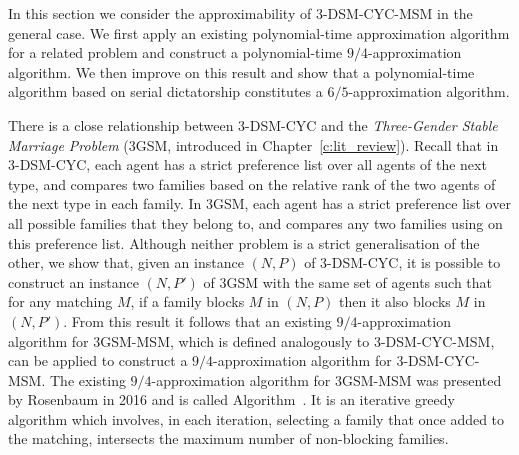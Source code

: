 In this section we consider the approximability of 3-DSM-CYC-MSM in the general case. We first apply an existing polynomial-time approximation algorithm for a related problem and construct a polynomial-time $9/4$-approximation algorithm. We then improve on this result and show that a polynomial-time algorithm based on serial dictatorship constitutes a $6/5$-approximation algorithm.

There is a close relationship between 3-DSM-CYC and the \emph{Three-Gender Stable Marriage Problem} (3GSM, introduced in Chapter~\ref{c:lit_review}). Recall that in 3-DSM-CYC, each agent has a strict preference list over all agents of the next type, and compares two families based on the relative rank of the two agents of the next type in each family. In 3GSM, each agent has a strict preference list over all possible families that they belong to, and compares any two families using on this preference list. Although neither problem is a strict generalisation of the other, we show that, given an instance $(N, P)$ of 3-DSM-CYC, it is possible to construct an instance $(N, P')$ of 3GSM with the same set of agents such that for any matching $M$, if a family blocks $M$ in $(N, P)$ then it also blocks $M$ in $(N, P')$. From this result it follows that an existing $9/4$-approximation algorithm for 3GSM-MSM, which is defined analogously to 3-DSM-CYC-MSM, can be applied to construct a $9/4$-approximation algorithm for 3-DSM-CYC-MSM. The existing $9/4$-approximation algorithm for 3GSM-MSM was presented by Rosenbaum in 2016 \cite{rosenbaum16} and is called Algorithm~. It is an iterative greedy algorithm which involves, in each iteration, selecting a family that once added to the matching, intersects the maximum number of non-blocking families.

